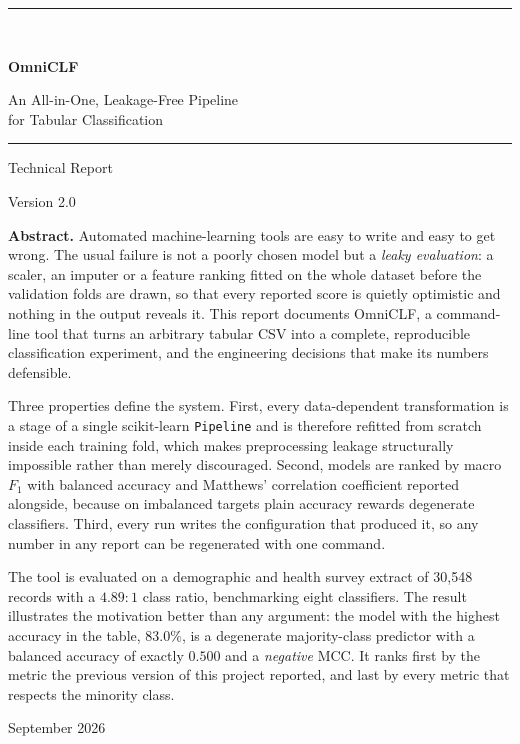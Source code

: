 \documentclass[11pt,a4paper]{article}
\begin{document}
\begin{titlepage}
\centering
\vspace*{2.2cm}

{\color{accent}\rule{\textwidth}{2pt}}\\[1.1em]
{\Huge\bfseries OmniCLF\par}
\vspace{0.7em}
{\LARGE An All-in-One, Leakage-Free Pipeline\\[0.3em] for Tabular Classification\par}
\vspace{0.9em}
{\color{accent}\rule{\textwidth}{2pt}}

\vspace{2.2cm}
{\large Technical Report\par}
\vspace{0.4em}
{\large Version 2.0\par}
\vspace{2.6cm}

\begin{minipage}{0.86\textwidth}
\small
\setlength{\parskip}{0.7em}\setlength{\parindent}{0pt}
\textbf{Abstract.} Automated machine-learning tools are easy to write and easy
to get wrong. The usual failure is not a poorly chosen model but a \emph{leaky
evaluation}: a scaler, an imputer or a feature ranking fitted on the whole
dataset before the validation folds are drawn, so that every reported score is
quietly optimistic and nothing in the output reveals it. This report documents
OmniCLF, a command-line tool that turns an arbitrary tabular CSV into a
complete, reproducible classification experiment, and the engineering decisions
that make its numbers defensible.

Three properties define the system. First, every data-dependent transformation
is a stage of a single scikit-learn \texttt{Pipeline} and is therefore refitted
from scratch inside each training fold, which makes preprocessing leakage
structurally impossible rather than merely discouraged. Second, models are
ranked by macro $F_1$ with balanced accuracy and Matthews' correlation
coefficient reported alongside, because on imbalanced targets plain accuracy
rewards degenerate classifiers. Third, every run writes the configuration that
produced it, so any number in any report can be regenerated with one command.

The tool is evaluated on a demographic and health survey extract of 30{,}548
records with a $4.89\!:\!1$ class ratio, benchmarking eight classifiers. The
result illustrates the motivation better than any argument: the model with the
highest accuracy in the table, $83.0\%$, is a degenerate majority-class
predictor with a balanced accuracy of exactly $0.500$ and a \emph{negative}
MCC. It ranks first by the metric the previous version of this project
reported, and last by every metric that respects the minority class.
\end{minipage}

\vfill
{\small\color{inksoft} September 2026}
\end{titlepage}
\end{document}
